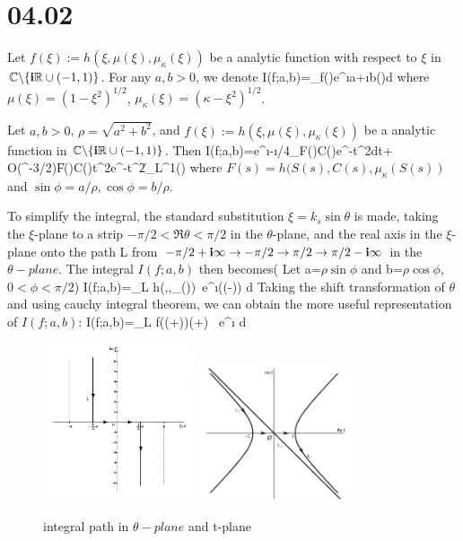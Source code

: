 \documentclass[12pt]{iopart}
\begin{document}
\section{04.02}
Let $f(\xi):=h(\xi,\mu(\xi),\mu_\kappa(\xi))$ be a analytic function with respect to $\xi$ in ${\mathbb{C}}\backslash\{\mathbf{i}{\mathbb{R}}\cup(-1,1)\}$. For any $a,b>0$, we denote
\ben
I(f;a,b)=\int_{\R}f(\xi)e^{\i a\xi+\i b\mu(\xi)}d\xi
\een
where $\mu(\xi)=(1-\xi^2)^{1/2}$, $\mu_\kappa(\xi)=(\kappa-\xi^2)^{1/2}$.
\begin{lem}\label{new_station_phase}
	Let $a,b >0$, $\rho=\sqrt{a^2+b^2}$, and $f(\xi):=h(\xi,\mu(\xi),\mu_\kappa(\xi))$ be a analytic function in ${\mathbb{C}}\backslash\{\mathbf{i}{\mathbb{R}}\cup(-1,1)\}$. Then 
	\ben\hspace{-2.5cm}
	I(f;a,b)=e^{\i\rho-\i\pi/4}\int_{\R}F()C()e^{-t^2}dt+
	O(\rho^{-3/2})\|F()C()t^2e^{-t^2}\|_{L^1(\R)}
	\een
	where $F(s)= h(S(s),C(s),\mu_\kappa(S(s))$ and $\sin\phi=a/\rho,\cos\phi=b/\rho$.
\end{lem}
\debproof
 To simplify the integral, the standard substitution $\xi=k_s\sin \theta$ is made, taking the $\xi$-plane to a strip $-\pi/2<\Re \theta <\pi/2$ in the $\theta$-plane, and the real axis in the $\xi$-plane onto the path L from $-\pi/2+\mathbf{i}\infty\rightarrow-\pi/2\rightarrow\pi/2\rightarrow\pi/2-\mathbf{i}\infty$ in the $\theta-plane$. The integral $I(f;a,b)$ then becomes( Let a=$\rho \sin\phi$  and b=$\rho\cos\phi$, $0<\phi<\pi/2$)
\be
 I(f;a,b)=\int_L h(\sin \theta,\cos \theta,\mu_\kappa(\sin \theta))\cos \theta \ e^{\i\rho(\cos (\theta-\phi))} d\theta
\ee
Taking the shift transformation of $\theta$ and using cauchy integral theorem, we can obtain the more useful representation of $I(f;a,b)$:
\be
I(f;a,b)=\int_L f(\sin (\theta+\phi))\cos (\theta+\phi) \ e^{\i\rho\cos \theta} d\theta
\ee
\begin{figure}
	\centering
	\includegraphics[width=0.4\textwidth]{./graphic/transform_th.png}
	\includegraphics[width=0.4\textwidth]{./graphic/transform_t.png}

	\caption{integral path in $\theta-plane$ and t-plane  }\label{transform_t}
\end{figure}
\end{document}
